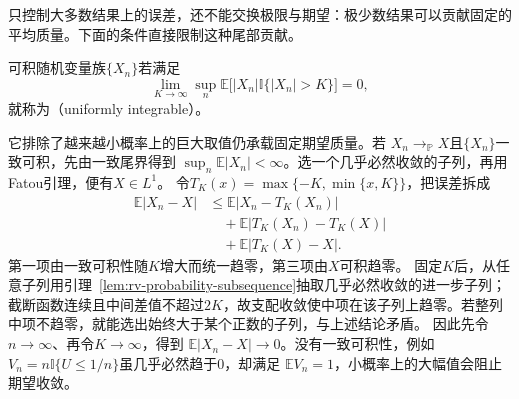 只控制大多数结果上的误差，还不能交换极限与期望：极少数结果可以贡献固定的平均质量。下面的条件直接限制这种尾部贡献。
\begin{definition}[一致可积]
  \label{def:probability-uniform-integrability}
可积随机变量族\(\{X_n\}\)若满足
\[
  \lim_{K\to\infty}
  \sup_n\mathbb{E}\bigl[
    |X_n|\mathbb{I}\{|X_n|>K\}
  \bigr]=0,
\]
就称为（uniformly integrable）。
\end{definition}
它排除了越来越小概率上的巨大取值仍承载固定期望质量。若
\(X_n\to_{\mathbb P}X\)且\(\{X_n\}\)一致可积，先由一致尾界得到
\(\sup_n\mathbb E|X_n|<\infty\)。选一个几乎必然收敛的子列，再用Fatou引理，便有\(X\in L^1\)。
令\(T_K(x)=\max\{-K,\min\{x,K\}\}\)，把误差拆成
\[
\begin{aligned}
\mathbb E|X_n-X|
 &\leq\mathbb E|X_n-T_K(X_n)|\\
 &\quad+\mathbb E|T_K(X_n)-T_K(X)|\\
 &\quad+\mathbb E|T_K(X)-X|.
\end{aligned}
\]
第一项由一致可积性随\(K\)增大而统一趋零，第三项由\(X\)可积趋零。
固定\(K\)后，从任意子列用引理~\ref{lem:rv-probability-subsequence}抽取几乎必然收敛的进一步子列；截断函数连续且中间差值不超过\(2K\)，故支配收敛使中项在该子列上趋零。若整列中项不趋零，就能选出始终大于某个正数的子列，与上述结论矛盾。
因此先令\(n\to\infty\)、再令\(K\to\infty\)，得到
\(\mathbb E|X_n-X|\to0\)。没有一致可积性，例如
\(V_n=n\mathbb{I}\{U\leq1/n\}\)虽几乎必然趋于\(0\)，却满足
\(\mathbb{E}V_n=1\)，小概率上的大幅值会阻止期望收敛。

